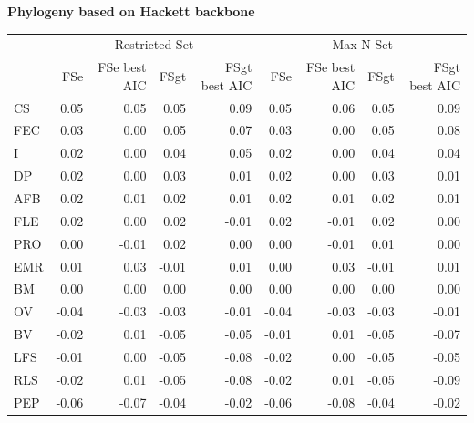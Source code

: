 \begin{table}
\begin{footnotesize}
\textbf{Phylogeny based on Hackett backbone}

\begin{tabular}{@{}l|rrrr|rrrr@{}}
\toprule
  & \multicolumn{4}{c|}{Restricted Set} & \multicolumn{4}{c}{Max N Set}\\
  & FSe & FSe best AIC & FSgt & FSgt best AIC & FSe & FSe best AIC & FSgt & FSgt best AIC\\
\midrule
CS & 0.05 & 0.05 & 0.05 & 0.09 & 0.05 & 0.06 & 0.05 & 0.09\\
FEC & 0.03 & 0.00 & 0.05 & 0.07 & 0.03 & 0.00 & 0.05 & 0.08\\
I & 0.02 & 0.00 & 0.04 & 0.05 & 0.02 & 0.00 & 0.04 & 0.04\\
DP & 0.02 & 0.00 & 0.03 & 0.01 & 0.02 & 0.00 & 0.03 & 0.01\\
AFB & 0.02 & 0.01 & 0.02 & 0.01 & 0.02 & 0.01 & 0.02 & 0.01\\
FLE & 0.02 & 0.00 & 0.02 & -0.01 & 0.02 & -0.01 & 0.02 & 0.00\\
PRO & 0.00 & -0.01 & 0.02 & 0.00 & 0.00 & -0.01 & 0.01 & 0.00\\
EMR & 0.01 & 0.03 & -0.01 & 0.01 & 0.00 & 0.03 & -0.01 & 0.01\\
BM & 0.00 & 0.00 & 0.00 & 0.00 & 0.00 & 0.00 & 0.00 & 0.00\\
OV & -0.04 & -0.03 & -0.03 & -0.01 & -0.04 & -0.03 & -0.03 & -0.01\\
BV & -0.02 & 0.01 & -0.05 & -0.05 & -0.01 & 0.01 & -0.05 & -0.07\\
LFS & -0.01 & 0.00 & -0.05 & -0.08 & -0.02 & 0.00 & -0.05 & -0.05\\
RLS & -0.02 & 0.01 & -0.05 & -0.08 & -0.02 & 0.01 & -0.05 & -0.09\\
PEP & -0.06 & -0.07 & -0.04 & -0.02 & -0.06 & -0.08 & -0.04 & -0.02\\
\bottomrule
\end{tabular}

\end{footnotesize}
\end{table}


